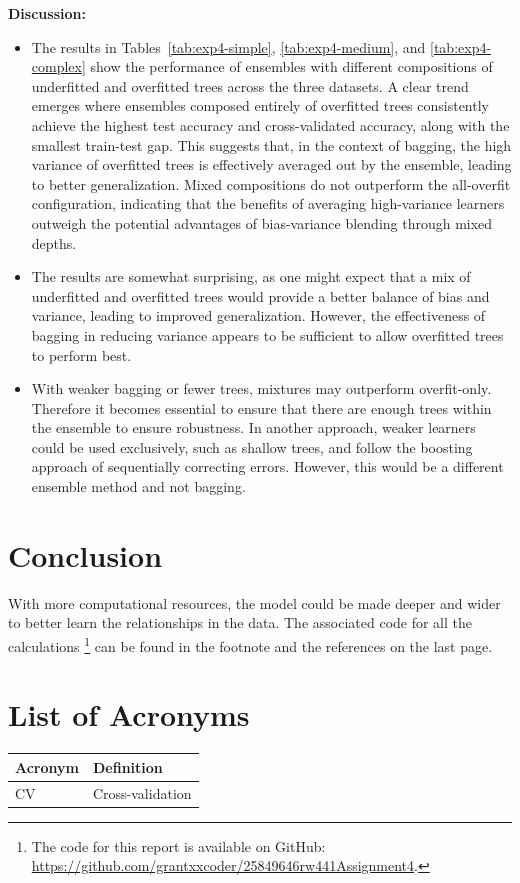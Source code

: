 \documentclass[conference]{IEEEtran}
\begin{document}
\textbf{Discussion:}
\begin{itemize}
  \item The results in Tables~\ref{tab:exp4-simple}, \ref{tab:exp4-medium}, and \ref{tab:exp4-complex} show the performance of ensembles with different
   compositions of underfitted and overfitted trees across the three datasets. A clear trend emerges where ensembles composed entirely of overfitted trees
    consistently achieve the highest test accuracy and cross-validated accuracy, along with the smallest train-test gap. This suggests that, in the context 
    of bagging, the high variance of overfitted trees is effectively averaged out by the ensemble, leading to better generalization. Mixed compositions
     do not outperform the all-overfit configuration, indicating that the benefits of averaging high-variance learners outweigh the potential advantages 
     of bias-variance blending through mixed depths.
  \item The results are somewhat surprising, as one might expect that a mix of underfitted and overfitted trees would provide a better balance of bias and variance,
   leading to improved generalization. However, the effectiveness of bagging in reducing variance appears to be sufficient to allow overfitted trees to perform best.
  \item With weaker bagging or fewer trees, mixtures may outperform overfit-only. Therefore it becomes essential to ensure that there are enough trees within the ensemble
  to ensure robustness. In another approach, weaker learners could be used exclusively, such as shallow trees, and follow the boosting approach of 
  sequentially correcting errors. However, this would be a different ensemble method and not bagging.
\end{itemize}



\section{Conclusion}
 With more computational resources, the model could be made deeper and wider to better learn the relationships in the data.
 The associated code for all the calculations
\footnote{The code for this report is available on GitHub: \url{https://github.com/grantxxcoder/25849646rw441Assignment4}.} can be found in the footnote and the references on the last page.
\appendix

\section*{List of Acronyms}
\begingroup
\setlength{\tabcolsep}{6pt}
\renewcommand{\arraystretch}{1.05}
\noindent\begin{tabular}{@{}p{}p{}@{}}
\textbf{Acronym} & \textbf{Definition} \\
\midrule
CV & Cross-validation \\
\end{tabular}
\endgroup



\end{document}
